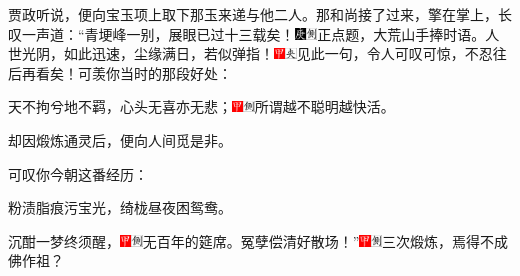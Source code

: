 贾政听说，便向宝玉项上取下那玉来递与他二人。那和尚接了过来，擎在掌上，长叹一声道：“青埂峰一别，展眼已过十三载矣！{\includegraphics[width=3mm]{../Images/00004}\includegraphics[width=3mm]{../Images/00011}\footnotesize \kaishu 正点题，大荒山手捧时语。}人世光阴，如此迅速，尘缘满日，若似弹指！{\includegraphics[width=3mm]{../Images/00002}\includegraphics[width=3mm]{../Images/00012}\footnotesize \kaishu 见此一句，令人可叹可惊，不忍往后再看矣！}可羡你当时的那段好处：

天不拘兮地不羁，心头无喜亦无悲；{\includegraphics[width=3mm]{../Images/00002}\includegraphics[width=3mm]{../Images/00011}\footnotesize \kaishu 所谓越不聪明越快活。}

却因煅炼通灵后，便向人间觅是非。

可叹你今朝这番经历：

粉渍脂痕污宝光，绮栊昼夜困鸳鸯。

沉酣一梦终须醒，{\includegraphics[width=3mm]{../Images/00002}\includegraphics[width=3mm]{../Images/00011}\footnotesize \kaishu 无百年的筵席。}冤孽偿清好散场！”{\includegraphics[width=3mm]{../Images/00002}\includegraphics[width=3mm]{../Images/00011}\footnotesize \kaishu 三次煅炼，焉得不成佛作祖？}

